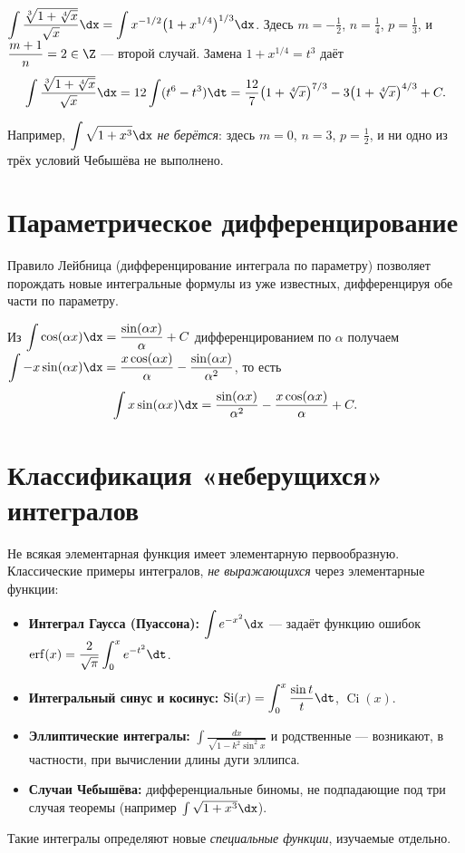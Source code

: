 \begin{example}
$\displaystyle\int\frac{\sqrt[3]{1+\sqrt[4]{x}}}{\sqrt{x}}\dx=\int x^{-1/2}\bigl(1+x^{1/4}\bigr)^{1/3}\dx$.
Здесь $m=-\tfrac12$, $n=\tfrac14$, $p=\tfrac13$, и $\dfrac{m+1}{n}=2\in\Z$ — второй случай. Замена
$1+x^{1/4}=t^3$ даёт
\[
  \int\frac{\sqrt[3]{1+\sqrt[4]{x}}}{\sqrt{x}}\dx
   =12\int(t^6-t^3)\dt=\frac{12}{7}\bigl(1+\sqrt[4]{x}\bigr)^{7/3}-3\bigl(1+\sqrt[4]{x}\bigr)^{4/3}+C.
\]
\end{example}

\begin{remark}
Например, $\displaystyle\int\sqrt{1+x^3}\dx$ \emph{не берётся}: здесь $m=0$, $n=3$, $p=\tfrac12$, и
ни одно из трёх условий Чебышёва не выполнено.
\end{remark}

\section{Параметрическое дифференцирование}

Правило Лейбница (дифференцирование интеграла по параметру) позволяет порождать новые интегральные
формулы из уже известных, дифференцируя обе части по параметру.

\begin{example}
Из $\displaystyle\int\cos(\alpha x)\dx=\frac{\sin(\alpha x)}{\alpha}+C$ дифференцированием по
$\alpha$ получаем $\displaystyle\int -x\sin(\alpha x)\dx=\frac{x\cos(\alpha x)}{\alpha}
-\frac{\sin(\alpha x)}{\alpha^2}$, то есть
\[
  \int x\sin(\alpha x)\dx=\frac{\sin(\alpha x)}{\alpha^2}-\frac{x\cos(\alpha x)}{\alpha}+C.
\]
\end{example}

\section{Классификация «неберущихся» интегралов}

Не всякая элементарная функция имеет элементарную первообразную. Классические примеры
интегралов, \emph{не выражающихся} через элементарные функции:
\begin{itemize}[leftmargin=*]
  \item \textbf{Интеграл Гаусса (Пуассона):} $\displaystyle\int e^{-x^2}\dx$ — задаёт функцию
        ошибок $\operatorname{erf}(x)=\dfrac{2}{\sqrt\pi}\displaystyle\int_0^x e^{-t^2}\dt$.
  \item \textbf{Интегральный синус и косинус:} $\displaystyle\operatorname{Si}(x)=\int_0^x\frac{\sin t}{t}\dt$,
        $\displaystyle\operatorname{Ci}(x)$.
  \item \textbf{Эллиптические интегралы:} $\displaystyle\int\frac{dx}{\sqrt{1-k^2\sin^2 x}}$ и
        родственные — возникают, в частности, при вычислении длины дуги эллипса.
  \item \textbf{Случаи Чебышёва:} дифференциальные биномы, не подпадающие под три случая теоремы
        (например $\int\sqrt{1+x^3}\dx$).
\end{itemize}
Такие интегралы определяют новые \emph{специальные функции}, изучаемые отдельно.
